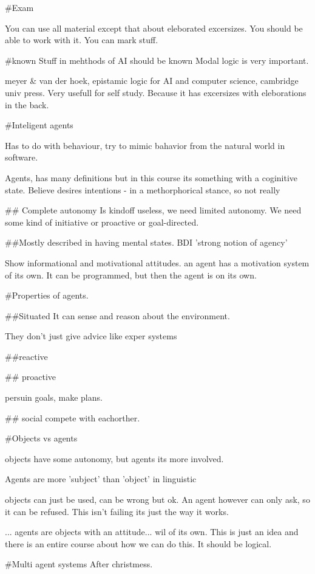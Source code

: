
#Exam

You can use all material except that about eleborated excersizes.
You should be able to work with it. You can mark stuff.

#known
Stuff in mehthods of AI should be known
Modal logic is very important.

meyer & van der hoek, epistamic logic for AI and computer science, cambridge
univ press.
Very usefull for self study. Because it has excersizes with eleborations in
the back.

#Inteligent agents

Has to do with behaviour, try to mimic bahavior from the natural world in
software.

Agents, has many definitions but in this course its something with a
coginitive state.
Believe desires intentions - in a methorphorical stance, so not really

## Complete autonomy
Is kindoff useless, we need limited autonomy.
We need some kind of initiative or proactive or goal-directed.

##Mostly described in having mental states.
BDI 'strong notion of agency'

Show informational and motivational attitudes. an agent has a
motivation system of its own. It can be programmed, but then
the agent is on its own.

#Properties of agents.

##Situated
It can sense and reason about the environment.

They don't just give advice like exper systems

##reactive

## proactive

persuin goals, make plans.


## social
compete with eachorther.

#Objects vs agents

objects have some autonomy, but agents its more involved.

Agents are more 'subject' than 'object' in linguistic

objects can just be used, can be wrong but ok. An agent however
can only ask, so it can be refused. This isn't failing
its just the way it works.


... agents are objects with an attitude... wil of its own.
This is just an idea and there is an entire course about how we can do this.
It should be logical.

#Multi agent systems
After christmess.

